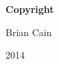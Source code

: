 
\newpage

\thispagestyle{empty}

\vspace*{1.5cm}

\begin{center}

{\bf \Huge Copyright}

\vspace{1cm}


   \Large Brian Cain\\

   \vspace{0.5cm}


   2014\\

   \vspace{0.5cm}

\end{center}
